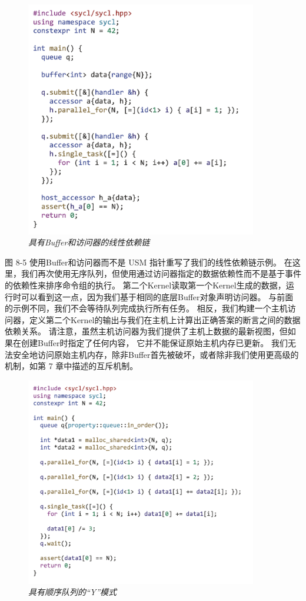 \begin{figure}[H]
	\centering
	\includegraphics[width=0.9\textwidth]{figs/F8.5.png}
	\caption{\textit{具有Buffer和访问器的线性依赖链 }}
\end{figure}

图 8-5 使用Buffer和访问器而不是 USM 指针重写了我们的线性依赖链示例。 
在这里，我们再次使用无序队列，但使用通过访问器指定的数据依赖性而不是基于事件的依赖性来排序命令组的执行。 
第二个Kernel读取第一个Kernel生成的数据，运行时可以看到这一点，因为我们基于相同的底层Buffer对象声明访问器。 
与前面的示例不同，我们不会等待队列完成执行所有任务。 
相反，我们构建一个主机访问器，定义第二个Kernel的输出与我们在主机上计算出正确答案的断言之间的数据依赖关系。 
请注意，虽然主机访问器为我们提供了主机上数据的最新视图，但如果在创建Buffer时指定了任何内容，
它并不能保证原始主机内存已更新。 
我们无法安全地访问原始主机内存，除非Buffer首先被破坏，或者除非我们使用更高级的机制，如第 7 章中描述的互斥机制。

\begin{figure}[H]
	\centering
	\includegraphics[width=0.9\textwidth]{figs/F8.6.png}
	\caption{\textit{具有顺序队列的“Y”模式 }}
\end{figure}

